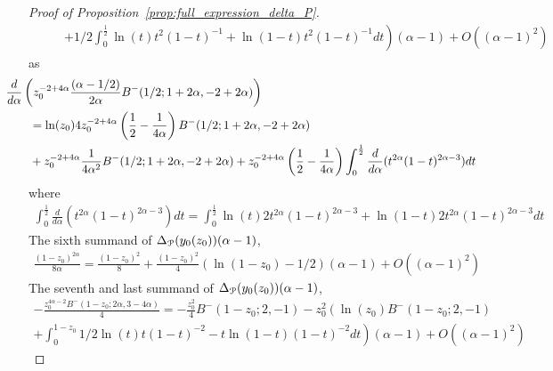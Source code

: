 \begin{proof}[Proof of Proposition~\ref{prop:full_expression_delta_P}]
\begin{align*}
 	&\hspace{20pt}\left.+1/2\int_0^{\frac{1}{2}} \ln(t)t^2(1-t)^{-1}+\ln(1-t)t^2(1-t)^{-1}dt \right)  (\alpha-1)+O( (\alpha-1)^2 )
\end{align*}
as
\begin{align*}
	&\hspace{-20pt}\frac{d}{d \alpha}\left( z_0^{-2 + 4 \alpha} \frac{(\alpha - 1/2 )}{2\alpha} 
		B^-(1/2; 1 + 2 \alpha, -2 + 2 \alpha)\right) \\
	&= \ln(z_0) 4 z_0^{-2+4\alpha} \left(\frac{1}{2}-\frac{1}{4\alpha}\right)B^-(1/2;1+2\alpha,-2+2\alpha)\\
	&+z_0^{-2+4\alpha}\frac{1}{4\alpha^2}B^-(1/2;1+2\alpha,-2+2\alpha)+z_0^{-2+4\alpha}\left(\frac{1}{2}-\frac{1}{4\alpha}\right)\int_0^{\frac{1}{2}} \frac{d}{d\alpha}(t^{2\alpha}(1-t)^{2\alpha-3})dt
\end{align*}
where
\begin{align*}
\int_0^{\frac{1}{2}} \frac{d}{d\alpha}(t^{2\alpha}(1-t)^{2\alpha-3})dt = \int_0^{\frac{1}{2}} \ln(t)2t^{2\alpha}(1-t)^{2\alpha-3}+\ln(1-t)2t^{2\alpha}(1-t)^{2\alpha-3}dt
\end{align*}
The sixth summand of $\Delta_{{\mathcal P}}(y_0(z_0))(\alpha-1)$,
\begin{align*}
\frac{(1 - z_0)^{2 \alpha}}{8 \alpha} = \frac{(1-z_0)^2}{8}+\frac{(1-z_0)^2}{4} (\ln(1-z_0)-1/2 )(\alpha-1)+O( (\alpha-1)^2 )
\end{align*}
The seventh and last summand of $\Delta_{{\mathcal P}}(y_0(z_0))(\alpha-1)$,
\begin{align*}
- \frac{z_0^{4 \alpha - 2} B^-(1 - z_0; 2 \alpha, 3 - 4 \alpha)}{4} = -\frac{z_0^2}{4}B^-(1-z_0;2,-1) - z_0^2 \left(\ln(z_0)B^-(1-z_0;2,-1) \right. \\
\left.+\int_0^{1-z_0} 1/2\ln(t)t(1-t)^{-2}-t\ln(1-t)(1-t)^{-2}dt \right) (\alpha-1)+O((\alpha-1)^2)
\end{align*}


\end{proof}
